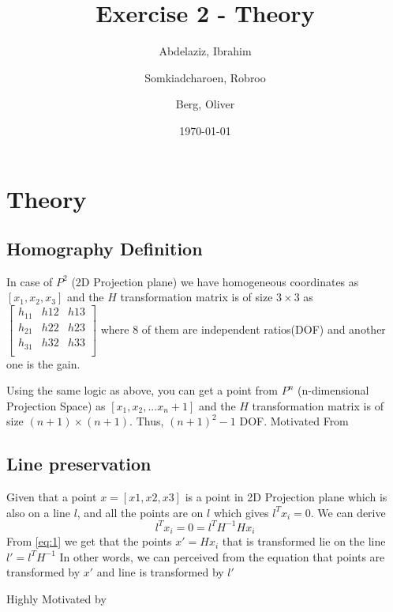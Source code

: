 \documentclass[a4paper, twoside, english]{article}
\title{Exercise 2 - Theory}
\author{
	Abdelaziz, Ibrahim
	\and
	Somkiadcharoen, Robroo
	\and
	Berg, Oliver
}
\date{\today}
\begin{document}
\maketitle


\section{Theory}

\subsection{Homography Definition}
In case of $P^2$ (2D Projection plane) we have homogeneous coordinates as $[x_1, x_2, x_3]$ and the $H$ transformation matrix is of size $3\times3$ as $\begin{bmatrix}
h_11&h12&h13 \\
h_21&h22&h23 \\
h_31&h32&h33 \\
\end{bmatrix}$ where 8 of them are independent ratios(DOF) and another one is the gain.

Using the same logic as above, you can get a point from $P^n$ (n-dimensional Projection Space) as $[x_1, x_2, ... x_n+1]$ and the $H$ transformation matrix is of size $(n+1)\times (n+1)$. Thus, $(n+1)^2-1$ DOF. Motivated From \cite{Stackoverflow}\cite{DynamicPntoPnAlgnmnt}

\subsection{Line preservation}

Given that a point $x=[x1,x2,x3]$ is a point in 2D Projection plane which is also on a line $l$, and all the points are on $l$ which gives $l^Tx_i=0$. We can derive
\begin{equation}
l^Tx_i=0=l^TH^{-1}Hx_i\label{eq:1}
\end{equation}
From \eqref{eq:1} we get that the points $x'=Hx_i$ that is transformed lie on the line $l'=l^TH^{-1}$ In other words, we can perceived from the equation that points are transformed by $x'$ and line is transformed by $l'$

Highly Motivated by \cite{ProjectiveGeomUMD} \cite{ProjectiveGeomIIT}




\end{document}

